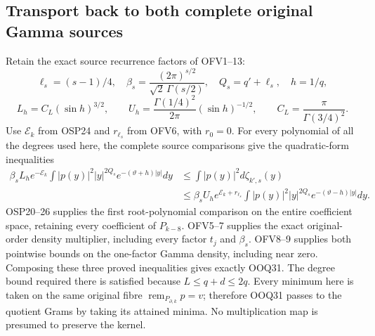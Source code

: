 \documentclass[11pt,a4paper]{article}
\begin{document}
\subsection{Transport back to both complete original Gamma sources}

Retain the exact source recurrence factors of OFV1--13:
\[
\ell_s=(s-1)/4,\quad
\beta_s=\frac{(2\pi)^{s/2}}{\sqrt2\,\Gamma(s/2)},\quad
Q_s=q'+\ell_s,\quad h=1/q,
\]
\[
L_h=C_L(\sin h)^{3/2},\qquad
U_h=\frac{\Gamma(1/4)^2}{2\pi}(\sin h)^{-1/2},
\qquad C_L=\frac{\pi}{\Gamma(3/4)^2}.
\tag{OOQ30}
\]
Use $\mathcal E_k$ from OSP24 and $r_{\ell_s}$ from OFV6,
with $r_0=0$. For every polynomial of all the degrees used
here, the complete source comparisons give the quadratic-form
inequalities
\[
\begin{split}
\beta_s L_h e^{-\mathcal E_k}
 \int |p(y)|^2|y|^{2Q_s}e^{-(\vartheta+h)|y|}dy
&\le\int |p(y)|^2d\zeta_{k',s}(y)\\
&\le
\beta_s U_h e^{\mathcal E_k+r_{\ell_s}}
 \int |p(y)|^2|y|^{2Q_s}e^{-(\vartheta-h)|y|}dy .
\end{split}\tag{OOQ31}
\]
OSP20--26 supplies the first root-polynomial comparison on the
entire coefficient space, retaining every coefficient of
$P_{k-8}$. OFV5--7 supplies the exact original-order density
multiplier, including every factor $t_j$ and $\beta_s$.
OFV8--9 supplies both pointwise bounds on the one-factor Gamma
density, including near zero. Composing these three proved
inequalities gives exactly OOQ31. The degree bound required
there is satisfied because $L\le q+d\le2q$.
Every minimum here is taken on the same original fibre
$\operatorname{rem}_{P_{\partial,k}}p=v$; therefore OOQ31
passes to the quotient Grams by taking its attained minima.
No multiplication map is presumed to preserve the kernel.
\end{document}
